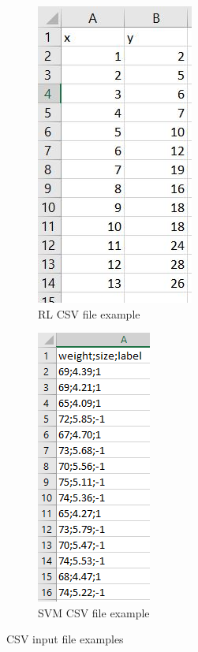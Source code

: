 \begin{figure}[H]
\centering
\begin{subfigure}{.5\textwidth}
\centering
\includegraphics[scale=1]{img/json/csvfileRL.png}
\caption{RL CSV file example}
\end{subfigure}%
\begin{subfigure}{.5\textwidth}
\centering
\includegraphics[scale=1]{img/json/csvfileSVM.png}
\caption{SVM CSV file example}
\end{subfigure}
\caption{CSV input file examples}
\end{figure}
\clearpage 